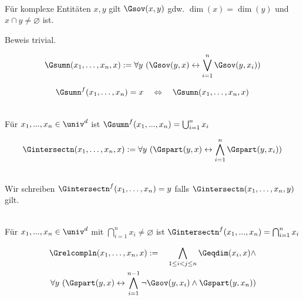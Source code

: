 \begin{satz}\ \\
    Für komplexe Entitäten $x,y$ gilt $\Gsov(x,y)$ gdw. $\dim(x) = \dim(y)$ und $x \cap y \neq \varnothing$ ist.
\end{satz}
Beweis trivial.


\begin{erin}
    \begin{align*}
        \Gsumn(x_{1},\ldots,x_{n},x) := \forall y\ (\Gsov(y,x) \leftrightarrow \bigvee^{n}_{i=1} \Gsov(y,x_{i}))
    \end{align*}
\end{erin}

\begin{erin}
    \begin{align*}
        \Gsumn^f(x_{1},\ldots,x_{n}) = x \quad \Leftrightarrow \quad \Gsumn(x_{1},\ldots,x_{n},x)
    \end{align*}
\end{erin}

\begin{hyp}\ \\
    Für $x_1, ..., x_n \in \univ^d$ ist $\Gsumn^f(x_1, ..., x_n) = \bigcup_{i=1}^n x_i$
\end{hyp}


\begin{erin}
    \begin{align*}
        \Gintersectn(x_{1},\ldots,x_{n},x)  := \forall y\ (\Gspart(y,x) \leftrightarrow \bigwedge^{n}_{i=1} \Gspart(y,x_{i}))
    \end{align*}
\end{erin}

\begin{erin}\ \\
    Wir schreiben $\Gintersectn^f(x_{1},\ldots,x_{n}) = y$ falls $\Gintersectn(x_{1},\ldots,x_{n},y)$ gilt.
\end{erin}

\begin{hyp}\ \\
    Für $x_1, ..., x_n \in \univ^d$ mit $\bigcap_{i=1}^n x_i \neq \varnothing$ ist $\Gintersectn^f(x_1, ..., x_n) = \bigcap_{i=1}^n x_i$
\end{hyp}


\begin{erin}
    \begin{align*}
        \Grelcompln(x_{1},\ldots,x_{n},x) := \hspace*{1em}\bigwedge_{1\leq i < j \leq n} \Geqdim(x_i, x) \wedge\\
        \forall y\ (\Gspart(y,x)
        \leftrightarrow \bigwedge^{n-1}_{i=1} \neg\Gsov(y,x_{i}) \wedge \Gspart(y, x_{n}))
    \end{align*}
\end{erin}

